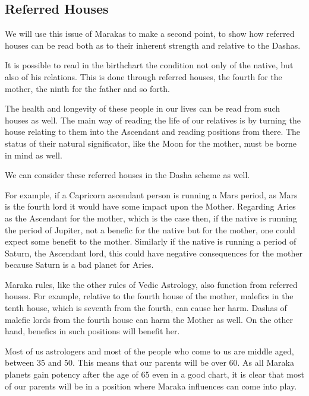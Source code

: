 \subsection{Referred Houses}
 

We will use this issue of Marakas to make a second point, to show how referred houses can be read both as to their inherent strength and relative to the Dashas.

 

It is possible to read in the birthchart the condition not only of the native, but also of his relations. This is done through referred houses, the fourth for the mother, the ninth for the father and so forth.
 

The health and longevity of these people in our lives can be read from such houses as well. The main way of reading the life of our relatives is by turning the house relating to them into the Ascendant and reading positions from there. The status of their natural significator, like the Moon for the mother, must be borne in mind as well.

 

We can consider these referred houses in the Dasha scheme as well.
 

For example, if a Capricorn ascendant person is running a Mars period, as Mars is the fourth lord it would have some impact upon the Mother. Regarding Aries as the Ascendant for the mother, which is the case then, if the native is running the period of Jupiter, not a benefic for the native but for the mother, one could expect some benefit to the mother. Similarly if the native is running a period of Saturn, the Ascendant lord, this could have negative consequences for the mother because Saturn is a bad planet for Aries.

 

Maraka rules, like the other rules of Vedic Astrology, also function from referred houses. For example, relative to the fourth house of the mother, malefics in the tenth house, which is seventh from the fourth, can cause her harm. Dashas of malefic lords from the fourth house can harm the Mother as well. On the other hand, benefics in such positions will benefit her.

 

Most of us astrologers and most of the people who come to us are middle aged, between 35 and 50. This means that our parents will be over 60. As all Maraka planets gain potency after the age of 65 even in a good chart, it is clear that most of our parents will be in a position where Maraka influences can come into play.

